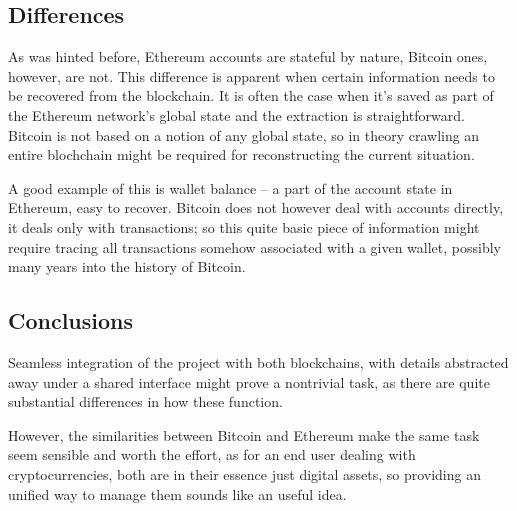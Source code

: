 \subsection{Differences}

As was hinted before, Ethereum accounts are stateful by nature,
Bitcoin ones, however, are not.
This difference is apparent when certain information needs to be
recovered from the blockchain.
It is often the case when it's saved as part of the Ethereum network's
global state and the extraction is straightforward.
Bitcoin is not based on a notion of any global state,
so in theory crawling an entire blochchain
might be required for reconstructing the current situation.

A good example of this is wallet balance
-- a part of the account state in Ethereum, easy to recover.
Bitcoin does not however deal with accounts directly,
it deals only with transactions;
so this quite basic piece of information might require
tracing all transactions somehow associated with a given wallet,
possibly many years into the history of Bitcoin.

\subsection{Conclusions}

Seamless integration of the project with both blockchains,
with details abstracted away under a shared interface
might prove a nontrivial task,
as there are quite substantial
differences in how these function.

However, the similarities between Bitcoin and Ethereum
make the same task seem sensible and worth the effort,
as for an end user dealing with cryptocurrencies,
both are in their essence just digital assets,
so providing an unified way to manage them
sounds like an useful idea.
